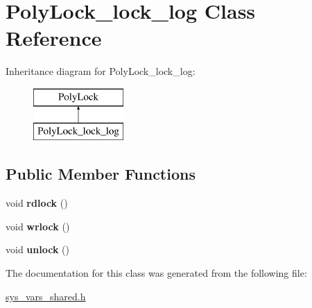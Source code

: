 \hypertarget{classPolyLock__lock__log}{}\section{Poly\+Lock\+\_\+lock\+\_\+log Class Reference}
\label{classPolyLock__lock__log}
Inheritance diagram for Poly\+Lock\+\_\+lock\+\_\+log\+:\begin{figure}[H]
\begin{center}
\leavevmode
\includegraphics[height=2.000000cm]{classPolyLock__lock__log}
\end{center}
\end{figure}
\subsection*{Public Member Functions}
\begin{DoxyCompactItemize}
\item 
\mbox{\label{classPolyLock__lock__log_a4ca3cab0fb96451e0726b7a6a9db407d}} 
void {\bfseries rdlock} ()
\item 
\mbox{\label{classPolyLock__lock__log_a19753bafc185b2c15121326b49d767e2}} 
void {\bfseries wrlock} ()
\item 
\mbox{\label{classPolyLock__lock__log_aac2d889532851599c24a9fa6426b503e}} 
void {\bfseries unlock} ()
\end{DoxyCompactItemize}


The documentation for this class was generated from the following file\+:\begin{DoxyCompactItemize}
\item 
\mbox{\hyperlink{sys__vars__shared_8h}{sys\+\_\+vars\+\_\+shared.\+h}}\end{DoxyCompactItemize}
